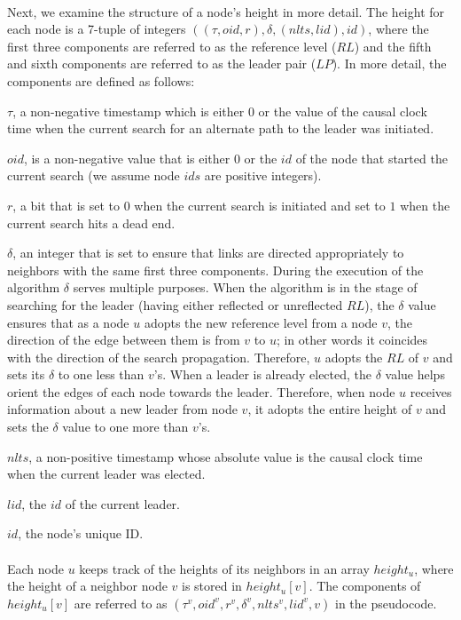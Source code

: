 \paragraph{}Next, we examine the structure of a node’s height in more detail. The height for each node is a 7-tuple of integers $((\tau , oid, r), \delta , (nlts, lid), id)$, where the first three components are referred to as the reference level ($RL$) and the fifth and sixth components are referred to as the leader pair ($LP$). In more detail, the components are defined as follows:
\begin{list}{--}{}
	\item $\tau$, a non-negative timestamp which is either $0$ or the value of the causal clock time when the current search for an alternate path to the leader was initiated.
	\item $oid$, is a non-negative value that is either $0$ or the $id$ of the node that started the current search (we assume node $ids$ are positive integers).
	\item $r$, a bit that is set to $0$ when the current search is initiated and set to $1$ when the current search hits a dead end.
	\item  $\delta$, an integer that is set to ensure that links are directed appropriately to neighbors with the same first three components. During the execution of the algorithm $\delta$ serves multiple purposes. When the algorithm is in the stage of searching for the leader (having either reflected or unreflected $RL$), the $\delta$ value ensures that as a node $u$ adopts the new reference level from a node $v$, the direction of the edge between them is from $v$ to $u$; in other words it coincides with the direction of the search propagation. Therefore, $u$ adopts the $RL$ of $v$ and sets its $\delta$ to one less than $v$’s. When a leader is already elected, the $\delta$ value helps orient the edges of each node towards the leader. Therefore, when node $u$ receives information about a new leader from node $v$, it adopts the entire height of $v$ and sets the $\delta$ value to one more than $v$’s.
	\item $nlts$, a non-positive timestamp whose absolute value is the causal clock time when the current leader was elected.
	\item $lid$, the $id$ of the current leader.
	\item $id$, the node’s unique ID.
\end{list}
\paragraph{}Each node $u$ keeps track of the heights of its neighbors in an array $height_u$, where the height of a neighbor node $v$ is stored in $height_u[v]$. The components of $height_u[v]$ are referred to as $(\tau ^v , oid^v , r^v , \delta ^v , nlts^v , lid^v , v)$ in the pseudocode.
